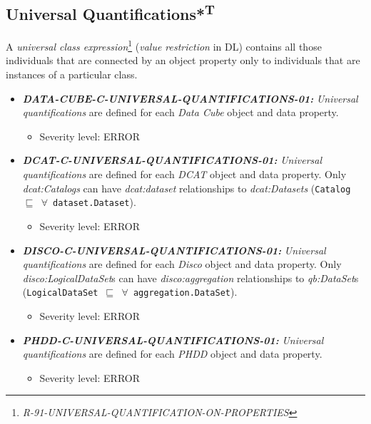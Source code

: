 \documentclass{llncs}
\newcommand{\ms}[1]{\texttt{#1}}
\begin{document}
\subsection{Universal Quantifications*\textsuperscript{T}}

A \emph{universal class expression}\footnote{{\em R-91-UNIVERSAL-QUANTIFICATION-ON-PROPERTIES}} ({\em value restriction} in DL) contains all those individuals that are connected by an object property only to individuals that are instances of a particular class.

\begin{itemize}
	\item \textbf{{\em DATA-CUBE-C-UNIVERSAL-QUANTIFICATIONS-01:}}
	\emph{Universal quantifications} are defined for each \emph{Data Cube} object and data property.
	\begin{itemize}
		\item Severity level: ERROR
	\end{itemize}
\end{itemize}

\begin{itemize}
	\item \textbf{{\em DCAT-C-UNIVERSAL-QUANTIFICATIONS-01:}}
	\emph{Universal quantifications} are defined for each \emph{DCAT} object and data property.
	Only {\em dcat:Catalogs} can have {\em dcat:dataset} relationships to {\em dcat:Datasets} (\ms{Catalog $\sqsubseteq$ $\forall$ dataset.Dataset}).
	\begin{itemize}
		\item Severity level: ERROR
	\end{itemize}
\end{itemize}

\begin{itemize}
	\item \textbf{{\em DISCO-C-UNIVERSAL-QUANTIFICATIONS-01:}}
	\emph{Universal quantifications} are defined for each \emph{Disco} object and data property.
  Only {\em disco:LogicalDataSet}s can have {\em disco:aggregation} relationships to {\em qb:DataSet}s (\ms{LogicalDataSet $\sqsubseteq$ $\forall$ aggregation.DataSet}).
	\begin{itemize}
		\item Severity level: ERROR
	\end{itemize}
\end{itemize}

\begin{itemize}
	\item \textbf{{\em PHDD-C-UNIVERSAL-QUANTIFICATIONS-01:}}
	\emph{Universal quantifications} are defined for each \emph{PHDD} object and data property.
	\begin{itemize}
		\item Severity level: ERROR
	\end{itemize}
\end{itemize}
\end{document}
